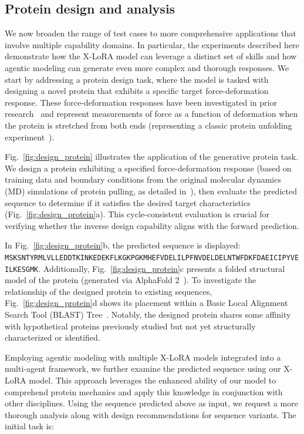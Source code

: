 \subsection{Protein design and analysis}

We now broaden the range of test cases to more comprehensive applications that involve multiple capability domains. In particular, the experiments described here demonstrate how the X-LoRA model can leverage a distinct set of skills and how agentic modeling can generate even more complex and thorough responses. We start by addressing a protein design task, where the model is tasked with designing a novel protein that exhibits a specific target force-deformation response. These force-deformation responses have been investigated in prior research~\cite{Ni2023ForceGen:Model} and represent measurements of force as a function of deformation when the protein is stretched from both ends (representing a classic protein unfolding experiment~\cite{Lu1998UnfoldingSimulation.}).

Fig.~\ref{fig:design_protein} illustrates the application of the generative protein task. We design a protein exhibiting a specified force-deformation response (based on training data and boundary conditions from the original molecular dynamics (MD) simulations of protein pulling, as detailed in~\cite{Ni2023ForceGen:Model}), then evaluate the predicted sequence to determine if it satisfies the desired target characteristics (Fig.~\ref{fig:design_protein}a). This cycle-consistent evaluation is crucial for verifying whether the inverse design capability aligns with the forward prediction.

In Fig.~\ref{fig:design_protein}b, the predicted sequence is displayed: \texttt{MSKSNTYRMLVLLEDDTKINKEDEKFLKGKPGKMHEFVDELILPFNVDELDELNTWFDKFDAEICIPYVEILKESGMK}. Additionally, Fig.~\ref{fig:design_protein}c presents a folded structural model of the protein (generated via AlphaFold 2~\cite{Jumper2021HighlyAlphaFoldb}). To investigate the relationship of the designed protein to existing sequences, Fig.~\ref{fig:design_protein}d shows its placement within a Basic Local Alignment Search Tool (BLAST) Tree~\cite{Altschul1990BasicTool}. Notably, the designed protein shares some affinity with hypothetical proteins previously studied but not yet structurally characterized or identified.

Employing agentic modeling with multiple X-LoRA models integrated into a multi-agent framework, we further examine the predicted sequence using our X-LoRA model. This approach leverages the enhanced ability of our model to comprehend protein mechanics and apply this knowledge in conjunction with other disciplines. Using the sequence predicted above as input, we request a more thorough analysis along with design recommendations for sequence variants. The initial task is:

